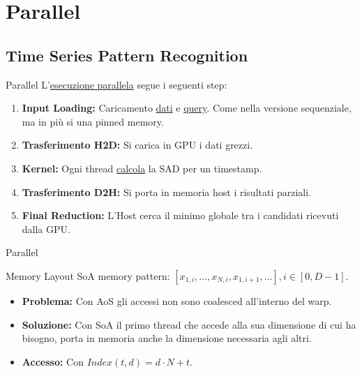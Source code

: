 \section{Parallel}
\subsection{Time Series Pattern Recognition}

\begin{frame}{Parallel}
        L'\href{https://github.com/edoardosarri24/time-series-pattern-recognition/blob/a9dfa266d9fea1eae1e7256da641cce54909b2f5/parallel/src/main.cpp}{esecuzione parallela} segue i seguenti step:
        \begin{enumerate}
            \item \textbf{Input Loading:} Caricamento \href{https://github.com/edoardosarri24/time-series-pattern-recognition/blob/ad87a0253ee835e58eb0952dae458c5aa90ee3a1/parallel/src/data_loader.cpp}{dati} e \href{https://github.com/edoardosarri24/time-series-pattern-recognition/blob/a9dfa266d9fea1eae1e7256da641cce54909b2f5/parallel/src/query_loader.cpp}{query}. Come nella versione sequenziale, ma in più si una pinned memory.
            \item \textbf{Trasferimento H2D:} Si carica in GPU i dati grezzi.
            \item \textbf{Kernel:} Ogni thread \href{https://github.com/edoardosarri24/time-series-pattern-recognition/blob/af609693f2d00e4c02d028b127c87bc5454f72d8/parallel/src/kernel.cu}{calcola} la SAD per un timestamp.
            \item \textbf{Trasferimento D2H:} Si porta in memoria host i risultati parziali.
            \item \textbf{Final Reduction:} L'Host cerca il minimo globale tra i candidati ricevuti dalla GPU.
        \end{enumerate}
\end{frame}

\begin{frame}{Parallel}
    \begin{block}{Memory Layout}
        SoA memory pattern: $[x_{1,i}, \dots, x_{N,i}, x_{1,i+1}, \dots], i\in[0, D-1]$.
        \begin{itemize}
            \item \textbf{Problema:} Con AoS gli accessi non sono coalesced all'interno del warp.
            \item \textbf{Soluzione:} Con SoA il primo thread che accede alla sua dimensione di cui ha bisogno, porta in memoria anche la dimensione necessaria agli altri.
            \item \textbf{Accesso:} Con $Index(t,d) = d\cdot N + t$.
        \end{itemize}
    \end{block}
\end{frame}

